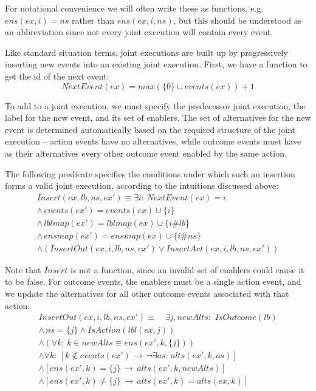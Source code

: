 For notational convenience we will often write these as functions,
e.g. $ens(ex,i)=ns$ rather than $ens(ex,i,ns)$, but this should
be understood as an abbreviation since not every joint execution will
contain every event.

Like standard situation terms, joint executions are built up by progressively
inserting new events into an existing joint execution. First, we have
a function to get the id of the next event:\[
NextEvent(ex)=max(\{0\}\cup events(ex))+1\]


To add to a joint execution, we must specify the predecessor joint
execution, the label for the new event, and its set of enablers. The
set of alternatives for the new event is determined automatically
based on the required structure of the joint execution -- action events
have no alternatives, while outcome events must have as their alternatives
every other outcome event enabled by the same action.

The following predicate specifies the conditions under which such
an insertion forms a valid joint execution, according to the intuitions
discussed above:\begin{gather*}
Insert(ex,lb,ns,ex')\equiv\exists i:\, NextEvent(ex)=i\\
\wedge\, events(ex')=events(ex)\cup\{i\}\\
\wedge\, lblmap(ex')=lblmap(ex)\cup\{i\#lb\}\\
\wedge\, ensmap(ex')=ensmap(ex)\cup\{i\#ns\}\\
\wedge\left(InsertOut(ex,i,lb,ns,ex')\vee InsertAct(ex,i,lb,ns,ex')\right)\end{gather*}


Note that $Insert$ is not a function, since an invalid set of enablers
could cause it to be false. For outcome events, the enablers must
be a single action event, and we update the alternatives for all other
outcome events associated with that action:\begin{gather*}
InsertOut(ex,i,lb,ns,ex')\equiv\,\,\,\,\,\,\exists j,newAlts:\,\, IsOutcome(lb)\\
\wedge\, ns=\{j\}\wedge IsAction(lbl(ex,j))\\
\wedge\left(\forall k:\, k\in newAlts\equiv ens(ex',k,\{j\})\right)\\
\wedge\forall k:\,\left[k\not\in events(ex')\,\rightarrow\,\neg\exists as:\, alts(ex',k,as)\right]\\
\wedge\left[ens(ex',k)=\{j\}\,\rightarrow\, alts(ex',k,newAlts)\right]\\
\wedge\left[ens(ex',k)\neq\{j\}\,\rightarrow\, alts(ex',k)=alts(ex,k)\right]\end{gather*}


